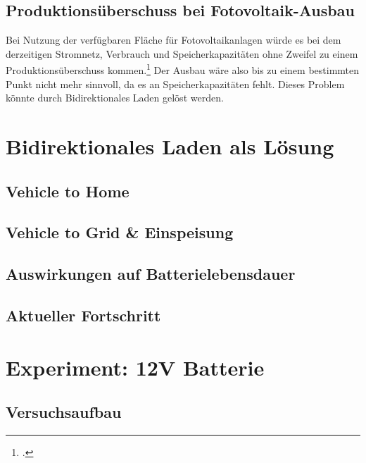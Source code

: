 \documentclass[12pt, ngerman]{article}
\begin{document}
    \subsection{Produktionsüberschuss bei Fotovoltaik-Ausbau}
    Bei Nutzung der verfügbaren Fläche für Fotovoltaikanlagen würde es bei dem derzeitigen Stromnetz, Verbrauch und
    Speicherkapazitäten ohne Zweifel zu einem Produktionsüberschuss kommen.\footcite{wirthAktuelleFaktenZur}
    Der Ausbau wäre also bis zu einem bestimmten Punkt nicht mehr sinnvoll, da es an Speicherkapazitäten fehlt.
    Dieses Problem könnte durch Bidirektionales Laden gelöst werden.


    \section{Bidirektionales Laden als Lösung}

    \subsection{Vehicle to Home}

    \subsection{Vehicle to Grid \& Einspeisung}

    \subsection{Auswirkungen auf Batterielebensdauer}

    \subsection{Aktueller Fortschritt}


    \section{Experiment: 12V Batterie}

    \subsection{Versuchsaufbau}
\end{document}
